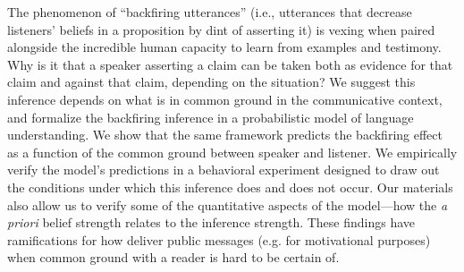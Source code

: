 \documentclass[10pt,letterpaper]{article}
\newcommand{\red}[1]{\textcolor{Red}{#1}}
\begin{document}
%




The phenomenon of ``backfiring utterances'' (i.e., utterances that decrease listeners' beliefs in a proposition by dint of asserting it) is vexing when paired alongside the incredible human capacity to learn from examples and testimony. 
Why is it that a speaker asserting a claim can be taken both as evidence for that claim and against that claim, depending on the situation? 
We suggest this inference depends on what is in common ground in the communicative context, and formalize the backfiring inference in a probabilistic model of language understanding.
We show that the same framework predicts the backfiring effect as a function of the common ground between speaker and listener.
We empirically verify the model's predictions in a behavioral experiment designed to draw out the conditions under which this inference does and does not occur. 
Our materials also allow us to verify some of the quantitative aspects of the model---how the \emph{a priori} belief strength relates to the inference strength.
These findings have ramifications for how deliver public messages (e.g. for motivational purposes) when common ground with a reader is hard to be certain of. 
\end{document}
